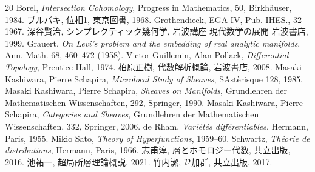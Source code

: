 \begin{thebibliography}{20} 
     Borel, 
        \textit{Intersection Cohomology}, 
        Progress in Mathematics, 50, Birkh\"auser, 1984.
     ブルバキ, 位相1, 東京図書, 1968.
     Grothendieck, EGA IV, Pub. IHES., 32 1967.
     深谷賢治, シンプレクティック幾何学, 岩波講座 現代数学の展開 岩波書店, 1999.
     Grauert, 
        \textit{On Levi's problem and the embedding of real analytic manifolds}, 
        Ann. Math. 68, 460--472 (1958).
     Victor Guillemin, Alan Pollack, 
        \textit{Differential Topology}, 
        Prentice-Hall, 1974.
     柏原正樹, 
        代数解析概論, 岩波書店, 2008.
     Masaki Kashiwara, Pierre Schapira, 
        \textit{Microlocal Study of Sheaves}, 
        SAst\`erisque 128, 1985.
     Masaki Kashiwara, Pierre Schapira, 
        \textit{Sheaves on Manifolds}, 
        Grundlehren der Mathematischen Wissenschaften, 292, Springer, 1990.
     Masaki Kashiwara, Pierre Schapira, 
        \textit{Categories and Sheaves}, 
        Grundlehren der Mathematischen Wissenschaften, 332, Springer, 2006.
     de Rham, 
        \textit{Vari\'et\'es diff\'erentiables}, 
        Hermann, Paris, 1955.
     Mikio Sato, 
        \textit{Theory of Hyperfunctions}, 
        1959--60.
     Schwartz, 
        \textit{Th\'eorie de distributions}, 
        Hermann, Paris, 1966.
     志甫淳, 層とホモロジー代数, 共立出版, 2016.
     池祐一, 超局所層理論概説, 2021.
     竹内潔, \(\mathcal{D}\)加群, 共立出版, 2017.
\end{thebibliography}




